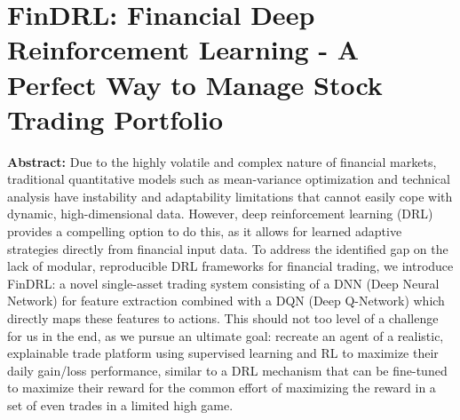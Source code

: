 \chapter{FinDRL: Financial Deep Reinforcement Learning - A Perfect Way to Manage Stock Trading Portfolio}
\textbf{Abstract: } 
Due to the highly volatile and complex nature of financial markets, traditional quantitative models such as mean-variance optimization and technical analysis have instability and adaptability limitations that cannot easily cope with dynamic, high-dimensional data. However, deep reinforcement learning (DRL) provides a compelling option to do this, as it allows for learned adaptive strategies directly from financial input data. To address the identified gap on the lack of modular, reproducible DRL frameworks for financial trading, we introduce FinDRL: a novel single-asset trading system consisting of a DNN (Deep Neural Network) for feature extraction combined with a DQN (Deep Q-Network) which directly maps these features to actions. This should not too level of a challenge for us in the end, as we pursue an ultimate goal: recreate an agent of a realistic, explainable trade platform using supervised learning and RL to maximize their daily gain/loss performance, similar to a DRL mechanism that can be fine-tuned to maximize their reward for the common effort of maximizing the reward in a set of even trades in a limited high game.

